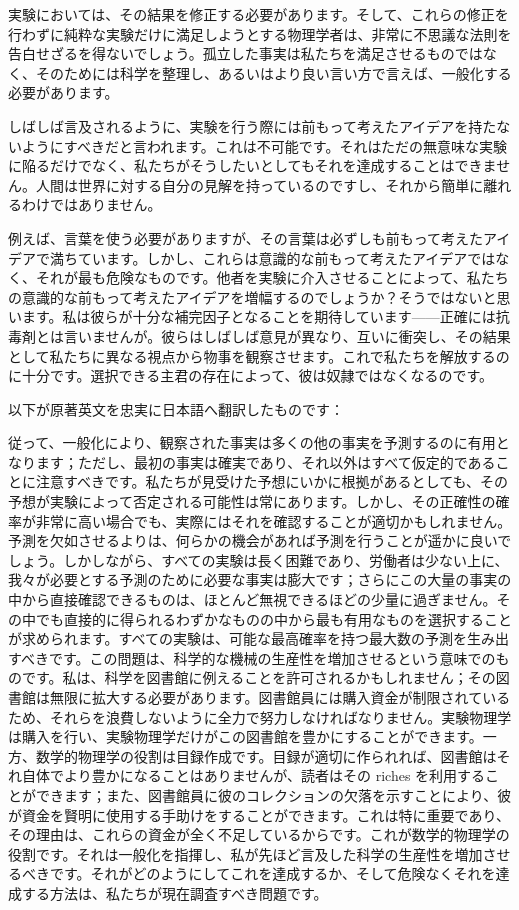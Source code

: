 \documentclass[a4paper,11pt,openany]{ltjsbook}
\begin{document}
実験においては、その結果を修正する必要があります。そして、これらの修正を行わずに純粋な実験だけに満足しようとする物理学者は、非常に不思議な法則を告白せざるを得ないでしょう。孤立した事実は私たちを満足させるものではなく、そのためには科学を整理し、あるいはより良い言い方で言えば、一般化する必要があります。

しばしば言及されるように、実験を行う際には前もって考えたアイデアを持たないようにすべきだと言われます。これは不可能です。それはただの無意味な実験に陥るだけでなく、私たちがそうしたいとしてもそれを達成することはできません。人間は世界に対する自分の見解を持っているのですし、それから簡単に離れるわけではありません。

例えば、言葉を使う必要がありますが、その言葉は必ずしも前もって考えたアイデアで満ちています。しかし、これらは意識的な前もって考えたアイデアではなく、それが最も危険なものです。他者を実験に介入させることによって、私たちの意識的な前もって考えたアイデアを増幅するのでしょうか？そうではないと思います。私は彼らが十分な補完因子となることを期待しています——正確には抗毒剤とは言いませんが。彼らはしばしば意見が異なり、互いに衝突し、その結果として私たちに異なる視点から物事を観察させます。これで私たちを解放するのに十分です。選択できる主君の存在によって、彼は奴隷ではなくなるのです。

以下が原著英文を忠実に日本語へ翻訳したものです：

従って、一般化により、観察された事実は多くの他の事実を予測するのに有用となります；ただし、最初の事実は確実であり、それ以外はすべて仮定的であることに注意すべきです。私たちが見受けた予想にいかに根拠があるとしても、その予想が実験によって否定される可能性は常にあります。しかし、その正確性の確率が非常に高い場合でも、実際にはそれを確認することが適切かもしれません。予測を欠如させるよりは、何らかの機会があれば予測を行うことが遥かに良いでしょう。しかしながら、すべての実験は長く困難であり、労働者は少ない上に、我々が必要とする予測のために必要な事実は膨大です；さらにこの大量の事実の中から直接確認できるものは、ほとんど無視できるほどの少量に過ぎません。その中でも直接的に得られるわずかなものの中から最も有用なものを選択することが求められます。すべての実験は、可能な最高確率を持つ最大数の予測を生み出すべきです。この問題は、科学的な機械の生産性を増加させるという意味でのものです。私は、科学を図書館に例えることを許可されるかもしれません；その図書館は無限に拡大する必要があります。図書館員には購入資金が制限されているため、それらを浪費しないように全力で努力しなければなりません。実験物理学は購入を行い、実験物理学だけがこの図書館を豊かにすることができます。一方、数学的物理学の役割は目録作成です。目録が適切に作られれば、図書館はそれ自体でより豊かになることはありませんが、読者はその riches を利用することができます；また、図書館員に彼のコレクションの欠落を示すことにより、彼が資金を賢明に使用する手助けをすることができます。これは特に重要であり、その理由は、これらの資金が全く不足しているからです。これが数学的物理学の役割です。それは一般化を指揮し、私が先ほど言及した科学の生産性を増加させるべきです。それがどのようにしてこれを達成するか、そして危険なくそれを達成する方法は、私たちが現在調査すべき問題です。
\end{document}
